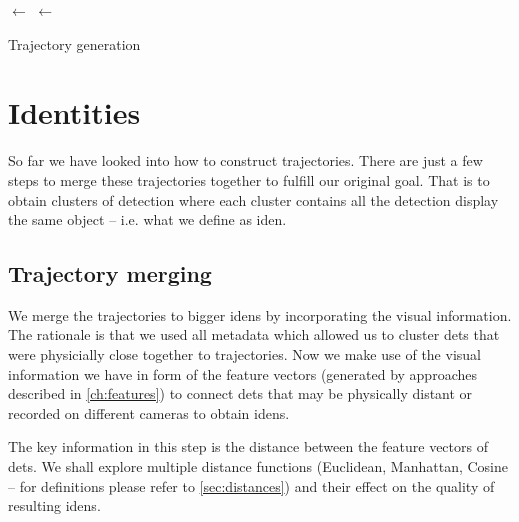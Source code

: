 \begin{algorithm}

 
 \BlankLine
 \Traj $\leftarrow$ \UnionFind{ }\;
 \Win $\leftarrow$ \Queue{ }\;
 \caption{Trajectory generation}
 \label{alg:trajectory_generation}
\end{algorithm}

\section{Identities}

\label{sec:generating_identities}

So far we have looked into how to construct trajectories.
There are just a few steps to merge these trajectories together to fulfill
our original goal. That is to obtain clusters of detection where each cluster
contains all the detection display the same object -- i.e. what we define
as \gls{iden}.

\subsection{Trajectory merging}

We merge the trajectories to bigger \glspl{iden} by incorporating the visual
information. The rationale is that we used all metadata which allowed us to
cluster \glspl{det} that were physicially close together to trajectories.
Now we make use of the visual information we have in form of the feature vectors
(generated by approaches described in \ref{ch:features}) to connect \glspl{det}
that may be physically distant or recorded on different cameras to obtain
\glspl{iden}.

The key information in this step is the distance between the feature
vectors of \glspl{det}. We shall explore multiple distance functions
(Euclidean, Manhattan, Cosine -- for definitions please refer to
\autoref{sec:distances}) and their effect on the quality of resulting
\glspl{iden}.

